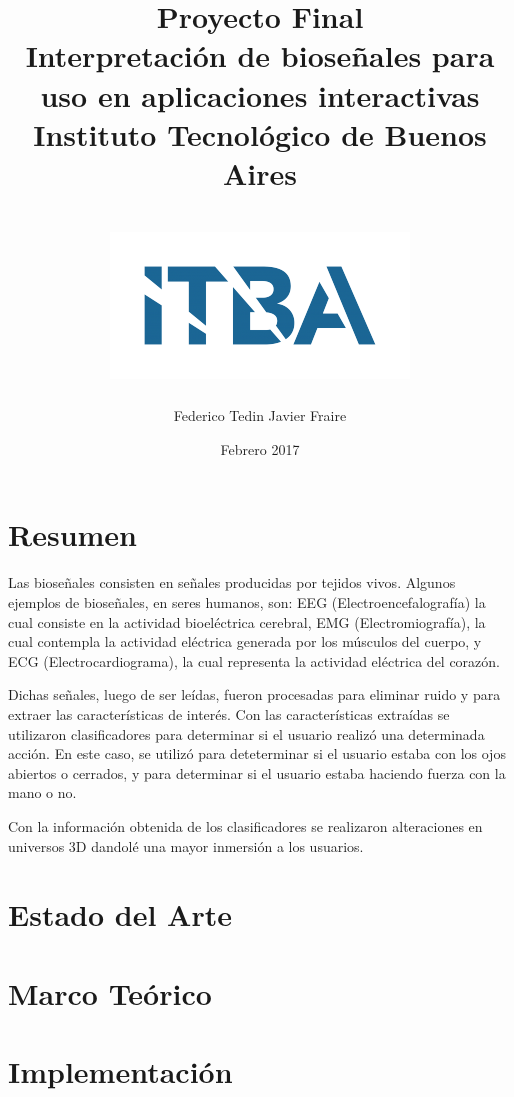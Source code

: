 \documentclass[]{report}
\title{
	{\Huge Proyecto Final}\\
	{\Huge Interpretación de bioseñales para uso en aplicaciones interactivas}
	{\large Instituto Tecnológico de Buenos Aires}\\~\\
	{\includegraphics{itba.png}}
}
\author{{Federico Tedin} {Javier Fraire}}
\date{Febrero 2017}
\begin{document}
\maketitle

\chapter*{Resumen}
\justifying
Las bioseñales consisten en señales producidas por tejidos vivos. Algunos ejemplos de bioseñales, en seres humanos, son: EEG (Electroencefalografía) la cual consiste en la actividad bioeléctrica cerebral, EMG (Electromiografía), la cual contempla la actividad eléctrica generada por los músculos del cuerpo, y ECG (Electrocardiograma), la cual representa la actividad eléctrica del corazón.

Dichas señales, luego de ser leídas, fueron procesadas para eliminar ruido y para extraer las características de interés. Con las características extraídas se utilizaron clasificadores para determinar si el usuario realizó una determinada acción. En este caso, se utilizó para deteterminar si el usuario estaba con los ojos abiertos o cerrados, y para determinar si el usuario estaba haciendo fuerza con la mano o no.

Con la información obtenida de los clasificadores se realizaron alteraciones en universos 3D dandolé una mayor inmersión a los usuarios.


\tableofcontents

\chapter{Estado del Arte}


\chapter{Marco Teórico}


\chapter{Implementación}


{}

 
\end{document}
